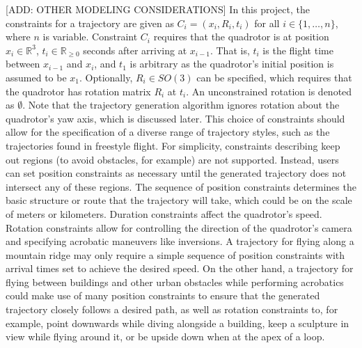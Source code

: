 \documentclass[pageno]{jpaper}
\begin{document}
[ADD: OTHER MODELING CONSIDERATIONS]
In this project, the constraints for a trajectory are given as $C_i = (x_i, R_i, t_i)$ for all $i \in \{1, \dots, n\}$, where $n$ is variable. Constraint $C_i$ requires that the quadrotor is at position $x_i \in \mathbb{R}^3$, $t_i \in \mathbb{R}_{\geq 0}$ seconds after arriving at $x_{i-1}$. That is, $t_i$ is the flight time between $x_{i-1}$ and $x_i$, and $t_1$ is arbitrary as the quadrotor's initial position is assumed to be $x_1$. Optionally, $R_i \in SO(3)$ can be specified, which requires that the quadrotor has rotation matrix $R_i$ at $t_i$. An unconstrained rotation is denoted as $\emptyset$. Note that the trajectory generation algorithm ignores rotation about the quadrotor's yaw axis, which is discussed later. This choice of constraints should allow for the specification of a diverse range of trajectory styles, such as the trajectories found in freestyle flight. For simplicity, constraints describing keep out regions (to avoid obstacles, for example) are not supported. Instead, users can set position constraints as necessary until the generated trajectory does not intersect any of these regions. The sequence of position constraints determines the basic structure or route that the trajectory will take, which could be on the scale of meters or kilometers. Duration constraints affect the quadrotor's speed. Rotation constraints allow for controlling the direction of the quadrotor's camera and specifying acrobatic maneuvers like inversions. A trajectory for flying along a mountain ridge may only require a simple sequence of position constraints with arrival times set to achieve the desired speed. On the other hand, a trajectory for flying between buildings and other urban obstacles while performing acrobatics could make use of many position constraints to ensure that the generated trajectory closely follows a desired path, as well as rotation constraints to, for example, point downwards while diving alongside a building, keep a sculpture in view while flying around it, or be upside down when at the apex of a loop.
\end{document}
